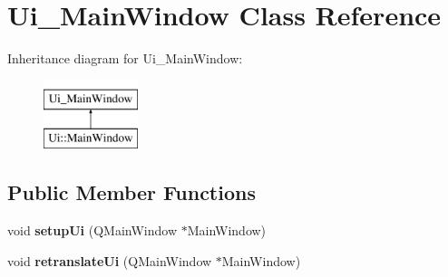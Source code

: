 \hypertarget{classUi__MainWindow}{\section{Ui\-\_\-\-Main\-Window Class Reference}
\label{classUi__MainWindow}
}
Inheritance diagram for Ui\-\_\-\-Main\-Window\-:\begin{figure}[H]
\begin{center}
\leavevmode
\includegraphics[height=2.000000cm]{d5/d3f/classUi__MainWindow}
\end{center}
\end{figure}
\subsection*{Public Member Functions}
\begin{DoxyCompactItemize}
\item 
\hypertarget{classUi__MainWindow_acf4a0872c4c77d8f43a2ec66ed849b58}{void {\bfseries setup\-Ui} (Q\-Main\-Window $\ast$Main\-Window)}\label{classUi__MainWindow_acf4a0872c4c77d8f43a2ec66ed849b58}

\item 
\hypertarget{classUi__MainWindow_a097dd160c3534a204904cb374412c618}{void {\bfseries retranslate\-Ui} (Q\-Main\-Window $\ast$Main\-Window)}\label{classUi__MainWindow_a097dd160c3534a204904cb374412c618}

\end{DoxyCompactItemize}
